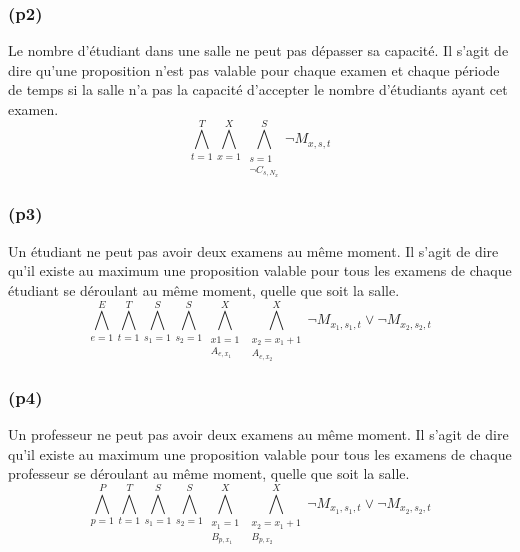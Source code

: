 \documentclass[a4paper,11pt]{article}
\begin{document}
\subsubsection{(p2)}
Le nombre d'étudiant dans une salle ne peut pas dépasser sa capacité.
Il s'agit de dire qu'une proposition n'est pas valable pour chaque examen et chaque période de temps si la salle n'a pas la capacité d'accepter le nombre d'étudiants ayant cet examen.
\begin{displaymath}
	\bigwedge\limits_{t=1}^{T}\bigwedge\limits_{x=1}^{X}\bigwedge\limits_{\substack{s=1 \\ \neg C_{s,N_{x}}}}^{S}  \neg M_{x,s,t}
\end{displaymath}

\subsubsection{(p3)}
Un étudiant ne peut pas avoir deux examens au même moment.
Il s'agit de dire qu'il existe au maximum une proposition valable pour tous les examens de chaque étudiant se déroulant au même moment, quelle que soit la salle.
\begin{displaymath}
\bigwedge\limits_{e=1}^{E}\bigwedge\limits_{t=1}^{T}\bigwedge\limits_{s_{1}=1}^{S}\bigwedge\limits_{s_{2}=1}^{S}\bigwedge\limits_{\substack{x1=1 \\ A_{e,x_{1}}}}^{X}\bigwedge\limits_{\substack{x_{2}=x_{1}+1 \\ A_{e,x_{2}}}}^{X} \neg M_{x_{1}, s_{1}, t} \vee \neg M_{x_{2}, s_{2}, t}
\end{displaymath}

\subsubsection{(p4)}
Un professeur ne peut pas avoir deux examens au même moment.
Il s'agit de dire qu'il existe au maximum une proposition valable pour tous les examens de chaque professeur se déroulant au même moment, quelle que soit la salle.
\begin{displaymath}
\bigwedge\limits_{p=1}^{P}\bigwedge\limits_{t=1}^{T}\bigwedge\limits_{s_{1}=1}^{S}\bigwedge\limits_{s_{2}=1}^{S}\bigwedge\limits_{\substack{x_{1}=1 \\ B_{p,x_{1}}}}^{X}\bigwedge\limits_{\substack{x_{2}=x_{1}+1 \\ B_{p,x_{2}}}}^{X} \neg M_{x_{1}, s_{1}, t} \vee \neg M_{x_{2}, s_{2}, t}
\end{displaymath}
\end{document}
